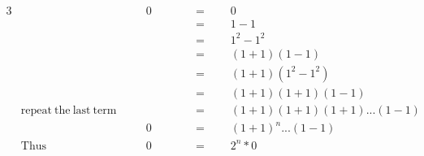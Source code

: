 \begin{alignat*}{3}
&\,&&\quad0\qquad&&=\qquad0\\
&\,&&\,&&=\qquad1-1\\
&\,&&\,&&=\qquad1^2-1^2\\
&\,&&\,&&=\qquad(1+1)(1-1)\\
&\,&&\,&&=\qquad(1+1)(1^2-1^2)\\
&\,&&\,&&=\qquad(1+1)(1+1)(1-1)\\
&\mathrm{repeat~the~last~term}&&\quad&&=\qquad(1+1)(1+1)(1+1)...(1-1)\\
&\,&&\quad0&&=\qquad(1+1)^n...(1-1)\\
&\mathrm{Thus}\,&&\quad0&&=\qquad2^n*0\\
\end{alignat*}
